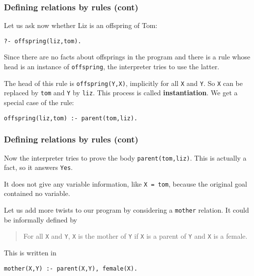 %
\begin{frame}[containsverbatim]
\frametitle{Defining relations by rules (cont)}

Let us ask now whether Liz is an offspring of Tom:
{\small
\begin{verbatim}
?- offspring(liz,tom).
\end{verbatim}
} 
Since there are no facts about offsprings in the program and there
is a rule whose head is an instance of \texttt{offspring}, the
\Prolog interpreter tries to use the latter.

The head of this rule is \texttt{offspring(Y,X)}, implicitly
for all \texttt{X} and \texttt{Y}. So \texttt{X}
can be replaced by \texttt{tom} and \texttt{Y} by
\texttt{liz}. This process is called \textbf{instantiation}. We
get a special case of the rule:
{\small
\begin{verbatim}
offspring(liz,tom) :- parent(tom,liz).
\end{verbatim}
}

\end{frame}

%
\begin{frame}[containsverbatim]
\frametitle{Defining relations by rules (cont)}

Now the \Prolog interpreter tries to prove the body
\texttt{parent(tom,liz)}. This is actually a fact, so it answers
\texttt{Yes}.

\bigskip

It does not give any variable information, like \texttt{X =
  tom}, because the original goal contained no variable.

\bigskip

Let us add more twists to our program by considering a
\texttt{mother} relation. It could be informally defined by
\begin{quote}
For all \texttt{X} and \texttt{Y}, \texttt{X} is the mother of
\texttt{Y} if \texttt{X} is a parent of \texttt{Y} and \texttt{X} is a
female.
\end{quote}
This is written in \Prolog
{\small
\begin{verbatim}
mother(X,Y) :- parent(X,Y), female(X).
\end{verbatim}
}

\end{frame}

